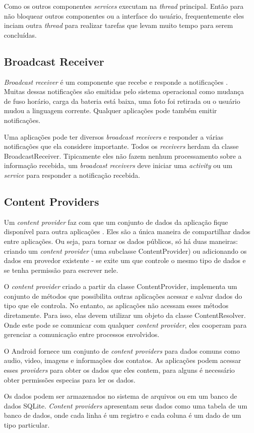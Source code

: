   Como os outros componentes \textit{services} executam na \textit{thread} principal. Então para não bloquear outros componentes 
  ou a interface do usuário, frequentemente eles inciam outra \textit{thread} para realizar tarefas que levam muito tempo para serem concluídas. 
\subsection{Broadcast Receiver}
\textit{Broadcast receiver} é um componente que recebe e responde a notificações \cite{receiver}. %
Muitas dessas notificações são emitidas pelo sistema operacional como mudança de fuso horário, 
carga da bateria está baixa, uma foto foi retirada ou o usuário mudou a linguagem corrente.
Qualquer aplicações pode também emitir notificações.

Uma aplicações pode ter diversos \textit{broadcast receivers} 
e responder a várias notificações que ela considere importante. Todos os \textit{receivers} 
herdam da classe BroadcastReceiver. Tipicamente eles não fazem nenhum processamento sobre a 
informação recebida, um \textit{broadcast receivers} deve iniciar uma \textit{activity} ou um \textit{service} para 
responder a notificação recebida.

\subsection{Content Providers}
Um \textit{content provider} faz com que um conjunto de dados da aplicação fique disponível para outra aplicações \cite{provider}. 
Eles são a única maneira de compartilhar dados entre aplicações. Ou seja, para tornar os dados públicos, só há duas maneiras: 
criando um \textit{content provider}
(uma subclasse ContentProvider) ou adicionando os dados em provedor existente -
se exite um que controle o mesmo tipo de dados e se tenha permissão para escrever nele.

O \textit{content provider} criado a partir da classe ContentProvider, implementa um conjunto de métodos
 que possibilita outras aplicações acessar e salvar dados do tipo que ele controla. No entanto, as aplicações 
 não acessam esses métodos diretamente. Para isso, elas devem utilizar um objeto da classe ContentResolver. 
 Onde este pode se comunicar com qualquer \textit{content provider}, eles cooperam para gerenciar a comunicação 
 entre processos envolvidos.
 
O Android fornece um conjunto de \textit{content providers} para dados comuns como 
audio, video, imagens e informações dos contatos. As aplicações podem acessar esses \textit{providers} 
para obter os dados que eles contem, para alguns é necessário obter permissões especias para ler os dados.

Os dados podem ser armazenados no sistema de arquivos ou em um banco de dados SQLite. 
\textit{Content providers} apresentam seus dados como uma tabela de um banco de dados, 
onde cada linha é um registro e cada coluna é um dado de um tipo particular. 
